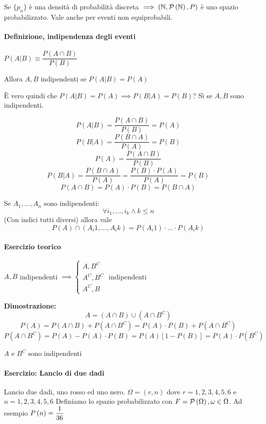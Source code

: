 Se $ \{p_n\} $ è una densità di probabilità discreta $ \implies \left( \mathbb{N}, \mathcal{P}\left(\mathbb{N}\right), P\right) $ è uno spazio probabilizzato. Vale anche per eventi non equiprobabili.

\paragraph{Definizione, indipendenza degli eventi} 

$ P(A|B) \equiv \dfrac{P(A \cap B)}{P(B)} $ 

Allora $ A,B $ indipendenti se $ P(A|B) = P(A) $

È vero quindi che $ P(A|B) = P(A) \implies P(B|A) = P(B) $? Sì se $ A,B $ sono indipendenti.

\[ P(A|B) = \dfrac{P(A \cap B)}{P(B)} = P(A) \]
\[ P(B|A) = \dfrac{P(B \cap A)}{P(A)} = P(B) \]
\[ P(A) = \dfrac{P(A \cap B)}{P(B)} \]
\[ P(B|A) = \dfrac{P(B \cap A)}{P(A)} = \dfrac{P(B) \cdot P(A)}{P(A)} = P(B)\]
\[ P(A \cap B)  = P(A) \cdot P(B) = P(B \cap A) \]

Se $ A_1, \dots, A_n $ sono indipendenti:
\[ \forall i_1, \dots, i_k \land k \leq n \] (Con indici tutti diversi) allora vale \[ P(A)\cap \left(A_i1,\dots,A_ik\right) = P(A_i1) \cdot \dots \cdot P(A_ik) \] 

\paragraph{Esercizio teorico}

$ A, B $ indipendenti $ \implies \begin{cases}
A, B^C \\
A^C, B^C \\
A^C, B
\end{cases} $ indipendenti

\textbf{Dimostrazione:}
\[ A = (A \cap B) \cup (A \cap B^C)  \]
\[ P(A) = P(A \cap B) + P(A \cap B^C) = P(A) \cdot P(B) + P(A \cap B^C) \]
\[ P(A \cap B^C) = P(A) - P(A) \cdot P(B) = P(A)\left[1 - P(B)\right] = P(A) \cdot P(B^C) \]

$ A $ e $ B^C $ sono indipendenti \enddim

\paragraph{Esercizio: Lancio di due dadi}
Lancio due dadi, uno rosso ed uno nero.
$ \Omega = (r, n) $ dove $ r = 1,2,3,4,5,6 $ e $ n = 1,2,3,4,5,6 $ 
Definiamo lo spazio probabilizzato con $ F = \mathcal{P}\left(\Omega\right), \omega \in \Omega $. Ad esempio $ P\left(n\right) = \dfrac{1}{36} $

